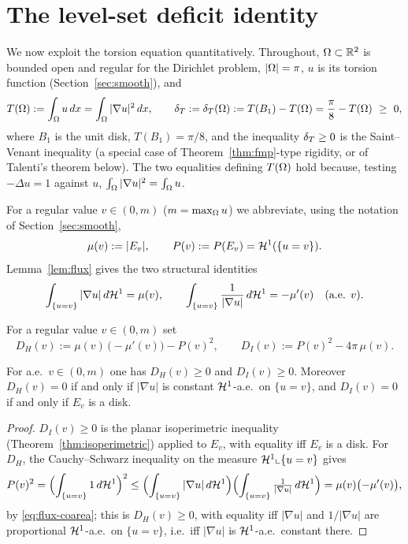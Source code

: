 \section{The level-set deficit identity}\label{sec:identity}

We now exploit the torsion equation quantitatively. Throughout,
$\Omega\subset\mathbb{R}^2$ is bounded open and regular for the Dirichlet problem,
$|\Omega|=\pi$, $u$ is its torsion function (Section~\ref{sec:smooth}), and
\[
   T(\Omega):=\int_\Omega u\,dx=\int_\Omega|\nabla u|^2\,dx,
   \qquad
   \delta_T:=\delta_T(\Omega):=T(B_1)-T(\Omega)=\frac{\pi}{8}-T(\Omega)\ \ge\ 0 ,
\]
where $B_1$ is the unit disk, $T(B_1)=\pi/8$, and the inequality $\delta_T\ge0$
is the Saint--Venant inequality (a special case of
Theorem~\ref{thm:fmp}-type rigidity, or of Talenti's theorem below). The
two equalities defining $T(\Omega)$ hold because, testing
$-\Delta u=1$ against $u$, $\int_\Omega|\nabla u|^2=\int_\Omega u$.

For a regular value $v\in(0,m)$ ($m=\max_\Omega u$) we abbreviate, using the
notation of Section~\ref{sec:smooth},
\[
   \mu(v):=|E_v|,\qquad P(v):=P(E_v)=\mathcal{H}^1(\{u=v\}).
\]
Lemma~\ref{lem:flux} gives the two structural identities
\begin{equation}\label{eq:flux-coarea}
   \int_{\{u=v\}}|\nabla u|\,d\mathcal{H}^1=\mu(v),
   \qquad
   \int_{\{u=v\}}\frac{1}{|\nabla u|}\,d\mathcal{H}^1=-\mu'(v)\quad(\text{a.e. }v).
\end{equation}

\begin{definition}\label{def:deficits}
For a regular value $v\in(0,m)$ set
\[
   D_H(v):=\mu(v)\,\bigl(-\mu'(v)\bigr)-P(v)^2,
   \qquad
   D_I(v):=P(v)^2-4\pi\,\mu(v).
\]
\end{definition}

\begin{lemma}\label{lem:nonneg}
For a.e.\ $v\in(0,m)$ one has $D_H(v)\ge0$ and $D_I(v)\ge0$. Moreover
$D_H(v)=0$ if and only if $|\nabla u|$ is constant $\mathcal{H}^1$-a.e.\ on
$\{u=v\}$, and $D_I(v)=0$ if and only if $E_v$ is a disk.
\end{lemma}

\begin{proof}
$D_I(v)\ge0$ is the planar isoperimetric inequality
(Theorem~\ref{thm:isoperimetric}) applied to $E_v$, with equality iff $E_v$
is a disk. For $D_H$, the Cauchy--Schwarz inequality on the measure
$\mathcal{H}^1\llcorner\{u=v\}$ gives
\[
   P(v)^2=\Bigl(\int_{\{u=v\}}1\,d\mathcal{H}^1\Bigr)^2
   \le\Bigl(\int_{\{u=v\}}|\nabla u|\,d\mathcal{H}^1\Bigr)
        \Bigl(\int_{\{u=v\}}\tfrac1{|\nabla u|}\,d\mathcal{H}^1\Bigr)
   =\mu(v)\bigl(-\mu'(v)\bigr),
\]
by \eqref{eq:flux-coarea}; this is $D_H(v)\ge0$, with equality iff
$|\nabla u|$ and $1/|\nabla u|$ are proportional $\mathcal{H}^1$-a.e.\ on
$\{u=v\}$, i.e.\ iff $|\nabla u|$ is $\mathcal{H}^1$-a.e.\ constant there.
\end{proof}


